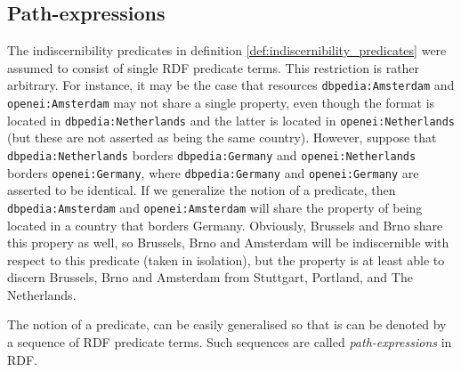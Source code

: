 \subsection{Path-expressions}
\label{sec:path_expressions}

The indiscernibility predicates in
  definition \ref{def:indiscernibility_predicates}
  were assumed to consist of single RDF predicate terms.
This restriction is rather arbitrary.
For instance,
  it may be the case that resources {\small \texttt{dbpedia:Amsterdam}}
  and {\small \texttt{openei:Amsterdam}} may not share a single property,
  even though the format is located in {\small \texttt{dbpedia:Netherlands}}
  and the latter is located in {\small \texttt{openei:Netherlands}}
  (but these are not asserted as being the same country).
However, suppose that {\small \texttt{dbpedia:Netherlands}}
  borders {\small \texttt{dbpedia:Germany}}
  and {\small \texttt{openei:Netherlands}}
  borders {\small \texttt{openei:Germany}},
  where {\small \texttt{dbpedia:Germany}} and
  {\small \texttt{openei:Germany}} are asserted to be identical.
If we generalize the notion of a predicate,
  then {\small \texttt{dbpedia:Amsterdam}} and
  {\small \texttt{openei:Amsterdam}} will share the property
  of being located in a country that borders Germany.
Obviously, Brussels and Brno share this propery as well,
  so Brussels, Brno and Amsterdam will be indiscernible with respect to
  this predicate (taken in isolation), but the property is at least
  able to discern Brussels, Brno and Amsterdam from
  Stuttgart, Portland, and The Netherlands.

The notion of a predicate,
can be easily generalised 
  so that is can be denoted by a sequence of RDF predicate terms.
Such sequences are called \emph{path-expressions} in RDF. 

